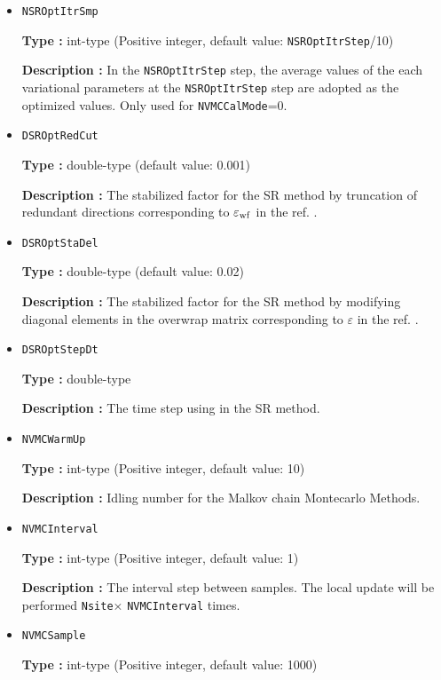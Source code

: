 \begin{itemize}
{\bf Description :} 
The whole step number to optimize variational parameters by SR method. Only used for \verb|NVMCCalMode|=0.
 
 \item  \verb|NSROptItrSmp|

{\bf Type :} int-type (Positive integer, default value: \verb|NSROptItrStep|/10)

{\bf Description :} In the \verb|NSROptItrStep| step, the average values of the each variational parameters at the \verb|NSROptItrStep| step are adopted as the optimized values. Only used for \verb|NVMCCalMode|=0.

\item   \verb|DSROptRedCut|
   
{\bf Type :} double-type (default value: 0.001)

{\bf Description :} The stabilized factor for the SR method by truncation of redundant directions corresponding to $\varepsilon_{\rm wf}$ in the ref. \cite{Tahara2008}.

 \item  \verb|DSROptStaDel| 
   
 {\bf Type :} double-type (default value: 0.02)

  {\bf Description :} The stabilized factor for the SR method by modifying diagonal elements in the overwrap matrix corresponding to $\varepsilon$ in the ref. \cite{Tahara2008}.
     
\item \verb|DSROptStepDt|

{\bf Type :} double-type 

{\bf Description :} The time step using in the SR method. 
 
\item \verb|NVMCWarmUp|

{\bf Type :} int-type (Positive integer, default value: 10)

{\bf Description :} Idling number for the Malkov chain Montecarlo Methods.

\item \verb|NVMCInterval|

{\bf Type :} int-type (Positive integer, default value: 1)

{\bf Description :} The interval step between samples. The local update will be performed \verb|Nsite|× \verb|NVMCInterval| times.

\item \verb|NVMCSample|

{\bf Type :} int-type (Positive integer, default value: 1000)


\end{itemize}
